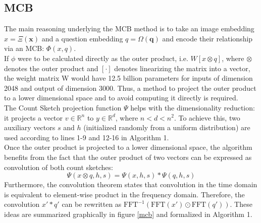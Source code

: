 \documentclass{article}
\begin{document}
\subsection{MCB}
The main reasoning underlying the MCB method is to take an image embedding $x = \Xi(\bm{x})$ and a question embedding $q=\Omega(\bm{q})$ and encode their relationship via an MCB: $\Phi(x,q)$.\\
If $\phi$ were to be calculated directly as the outer product, i.e. $W[x \otimes q]$, where $\otimes$ denotes the outer product and $[\cdot]$ denotes linearizing the matrix into a vector, the weight matrix W would have 12.5 billion parameters for inputs of dimension 2048 and output of dimension 3000. Thus, a method to project the outer product to a lower dimensional space and to avoid computing it directly is required.\\
The Count Sketch projection function $\Psi$ helps with the dimensionality reduction: it projects a vector $v \in \mathbb{R}^n$ to $y \in \mathbb{R}^d$, where $n < d < n^2$. To achieve this, two auxiliary vectors $s$ and $h$ (initialized randomly from a uniform distribution) are used according to lines 1-9 and 12-16 in Algorithm 1.\\
Once the outer product is projected to a lower dimensional space, the algorithm benefits from the fact that the outer product of two vectors can be expressed as convolution of both count sketches:
\begin{equation*}
    \Psi(x \otimes q, h, s) = \Psi(x, h, s) * \Psi(q, h, s)
\end{equation*}
Furthermore, the convolution theorem states that convolution in the time domain is equivalent to element-wise product in the frequency domain. Therefore, the convolution $x'*q'$ can be rewritten as $\text{FFT}^{-1}(\text{FFT}(x')\odot\text{FFT}(q'))$. These ideas are summarized graphically in figure \ref{mcb} and formalized in Algorithm 1.
\end{document}
